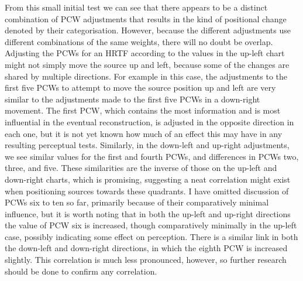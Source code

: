 From this small initial test we can see that there appears to be a distinct combination of PCW adjustments that results in the kind of positional change denoted by their categorisation. However, because the different adjustments use different combinations of the same weights, there will no doubt be overlap. Adjusting the PCWs for an HRTF according to the values in the up-left chart might not simply move the source up and left, because some of the changes are shared by multiple directions. For example in this case, the adjustments to the first five PCWs to attempt to move the source position up and left are very similar to the adjustments made to the first five PCWs in a down-right movement. The first PCW, which contains the most information and is most influential in the eventual reconstruction, is adjusted in the opposite direction in each one, but it is not yet known how much of an effect this may have in any resulting perceptual tests. Similarly, in the down-left and up-right adjustments, we see similar values for the first and fourth PCWs, and differences in PCWs two, three, and five. These similarities are the inverse of those on the up-left and down-right charts, which is promising, suggesting a neat correlation might exist when positioning sources towards these quadrants. I have omitted discussion of PCWs six to ten so far, primarily because of their comparatively minimal influence, but it is worth noting that in both the up-left and up-right directions the value of PCW six is increased, though comparatively minimally in the up-left case, possibly indicating some effect on perception. There is a similar link in both the down-left and down-right directions, in which the eighth PCW is increased slightly. This correlation is much less pronounced, however, so further research should be done to confirm any correlation.